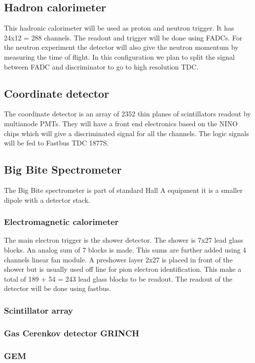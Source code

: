 \documentclass{article}
\begin{document}
\subsection{Hadron calorimeter}
This hadronic calorimeter will be used as proton and neutron trigger.
It has 24x12 = 288 channels. The readout and trigger will be done using FADCs.
For the neutron experiment the detector will also give the neutron momentum by measuring the time of flight. In this configuration we plan to split the signal between FADC and discriminator to go to high resolution TDC.

\subsection{Coordinate detector}
The coordinate detector is an array of 2352 thin planes of scintillators readout by multianode PMTs. They will have a front end electronics based on the NINO chips which will give a discriminated signal for all the channels. The logic signals will be fed to Fastbus TDC 1877S. 
\subsection{Big Bite Spectrometer}
The Big Bite spectrometer is part of standard Hall A equipment it is a smaller dipole with a detector stack.
\subsubsection{Electromagnetic calorimeter}
The main electron trigger is the shower detector. The shower is 7x27 lead glass blocks. An analog sum of 7 blocks is made. This sums are further added using 4 channels linear fan module.
A preshower layer 2x27 is placed in front of the shower but is usually used off line for pion electron identification. This make a total of 189 + 54 = 243 lead glass blocks to be readout.
The readout of the detector will be done using fastbus.
\subsubsection{Scintillator array}


\subsubsection{Gas Cerenkov detector GRINCH}
\subsubsection{GEM }
\end{document}
